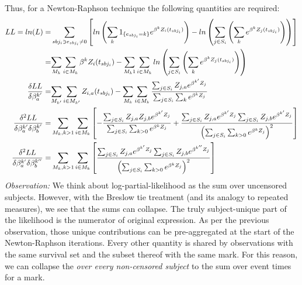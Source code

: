 \documentclass[10pt]{article}
\begin{document}
Thus, for a Newton-Raphson technique the following quantities are required:
\begin{align*}
{LL = ln(L)} =& 
    \sum_{sbj_i \ni e_{sbj_i} \ne 0}  \left[{ln\left({ \sum_k 1_{\{e_{sbj_i}=k\}}e^{\beta^kZ_i(t_{sbj_i})} }\right)
    - ln\left( { \sum_{j \in S_i} \left({ \sum_k e^{\beta^kZ_j(t_{sbj_i})} }\right) } \right) }\right]\\
 =& 
    {\sum_{M_k}\sum_{i \in M_k}{\beta^kZ_i(t_{sbj_i})} } - {\sum_{M_k1}\sum_{i \in M_k} ln\left( { \sum_{j \in S_i} \left({
        \sum_k e^{\beta^kZ_j(t_{sbj_i})} }\right) } \right) } \\
{\delta LL \over \delta \beta_a^{k'}}=&
    {\sum_{M_{k'}}\sum_{i \in M_{k'}} Z_{i,a}(t_{sbj_i})} -{\sum_{M_{k}}\sum_{i\in M_{k}}{\sum_{j\in S_i}Z_{j,a}e^{\beta^{k'}Z_j}
            \over \sum_{j\in S_i} \sum_k e^{\beta^kZ_j} } }\\
    {\delta^2 LL \over \delta \beta_a^{k'} \delta \beta_b^{k'}}=&\sum_{M_k, k>1}\sum_{i \in M_k}\left[{
        -{\sum_{j\in S_i}Z_{j,a}Z_{j,b}e^{\beta^{k'}Z_j}\over \sum_{j\in S_i} \sum_{k>0}e^{\beta^kZ_j} }
    +{\sum_{j\in S_i}Z_{j,a}e^{\beta^{k'}Z_j}\sum_{j\in S_i}Z_{j,b}e^{\beta^{k'}Z_j}
    \over \left({\sum_{j\in S_i} \sum_{k>0}e^{\beta^kZ_j}}\right)^2 } }\right] \\
    {\delta^2 LL \over \delta \beta_a^{k'} \delta \beta_b^{k''}}=&\sum_{M_k, k>1}\sum_{i \in M_k}\left[{
        {\sum_{j\in S_i}Z_{j,a}e^{\beta^{k'}Z_j}\sum_{j\in S_i}Z_{j,b}e^{\beta^{k''}Z_j}
    \over \left({\sum_{j\in S_i} \sum_{k>0}e^{\beta^kZ_j}}\right)^2 }
}\right] 
\end{align*}    
{\em Observation:} We think about log-partial-likelihood as the sum over uncensored subjects. However, with the Breslow tie treatment
    (and its analogy to repeated measures), we see that the sums can collapse.  The truly subject-unique
    part of the likelihood is the numerator of original expression. As per the previous observation, those unique contributions
    can be pre-aggregated at the start of the Newton-Raphson iterations.
    Every other quantity is shared by observations with the same survival set and the subset thereof with the same mark.   
    For this reason, we can collapse the {\em over every non-censored subject} to the sum over event times for a mark.
\end{document}
